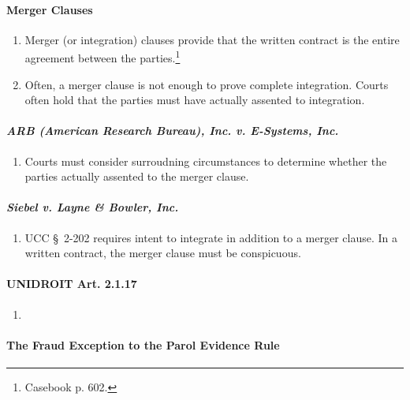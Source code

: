 \paragraph{Merger Clauses}

\begin{enumerate}
    \item Merger (or integration) clauses provide that the written contract is 
    the entire agreement between the parties.\footnote{Casebook p. 602.}
    \item Often, a merger clause is not enough to prove complete integration. 
    Courts often hold that the parties must have actually assented to 
    integration.
\end{enumerate}

\paragraph{\emph{ARB (American Research Bureau), Inc. v. E-Systems, Inc.}}

\begin{enumerate}
    \item Courts must consider surroudning circumstances to determine whether 
    the parties actually assented to the merger clause.
\end{enumerate}

\paragraph{\emph{Siebel v. Layne \& Bowler, Inc.}}

\begin{enumerate}
    \item UCC \S\ 2-202 requires intent to integrate in addition to a merger 
    clause. In a written contract, the merger clause must be conspicuous.
\end{enumerate}

\paragraph{UNIDROIT Art. 2.1.17}

\begin{enumerate}
    \item %
\end{enumerate}

\paragraph{The Fraud Exception to the Parol Evidence Rule}

